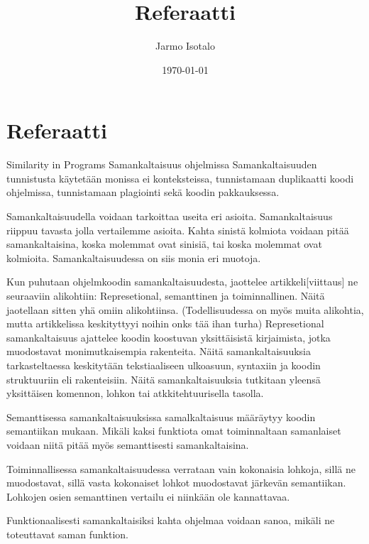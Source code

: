 \documentclass[finnish]{tktltiki2}
\title{Referaatti}
\author{Jarmo Isotalo}
\date{\today}
\theoremstyle{definition}
\theoremstyle{remark}
\begin{document}

\frontmatter      %

\maketitle        %
\makeabstract     %

\tableofcontents  %


\mainmatter       %
\section{Referaatti}
Similarity in Programs
Samankaltaisuus ohjelmissa
Samankaltaisuuden tunnistusta käytetään monissa ei konteksteissa, tunnistamaan duplikaatti koodi ohjelmissa, tunnistamaan plagiointi sekä koodin pakkauksessa.

Samankaltaisuudella voidaan tarkoittaa useita eri asioita. Samankaltaisuus riippuu tavasta jolla vertailemme asioita. Kahta sinistä kolmiota voidaan pitää samankaltaisina, koska molemmat ovat sinisiä, tai koska molemmat ovat kolmioita. Samankaltaisuudessa on siis monia eri muotoja.

Kun puhutaan ohjelmkoodin samankaltaisuudesta, jaottelee artikkeli[viittaus] ne seuraaviin alikohtiin: Represetional, semanttinen ja toiminnallinen. Näitä jaotellaan sitten yhä omiin alikohtiinsa.
(Todellisuudessa on myös muita alikohtia, mutta artikkelissa keskityttyyi noihin onks tää ihan turha)
Represetional samankaltaisuus ajattelee koodin koostuvan yksittäisistä kirjaimista, jotka muodostavat monimutkaisempia rakenteita. Näitä samankaltaisuuksia tarkasteltaessa keskitytään tekstiaaliseen ulkoasuun, syntaxiin ja koodin struktuuriin eli rakenteisiin.
Näitä samankaltaisuuksia tutkitaan yleensä yksittäisen komennon, lohkon tai atkkitehtuurisella tasolla.

Semanttisessa samankaltaisuuksissa samalkaltaisuus määräytyy koodin semantiikan mukaan. Mikäli kaksi funktiota omat toiminnaltaan samanlaiset voidaan niitä pitää myös semanttisesti samankaltaisina.

Toiminnallisessa samankaltaisuudessa verrataan vain kokonaisia lohkoja, sillä ne muodostavat, sillä vasta kokonaiset lohkot muodostavat järkevän semantiikan. Lohkojen osien semanttinen vertailu ei niinkään ole kannattavaa. 

Funktionaalisesti samankaltaisiksi kahta ohjelmaa voidaan sanoa, mikäli ne toteuttavat saman funktion. 
\end{document}

